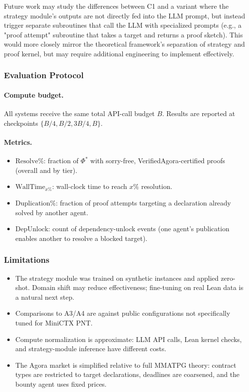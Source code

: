 \begin{remark}
Future work may study the differences between C1 and a variant where the strategy module's outputs are not directly fed into the LLM prompt, but instead trigger separate subroutines that call the LLM with specialized prompts (e.g., a "proof attempt" subroutine that takes a target and returns a proof sketch). This would more closely mirror the theoretical framework's separation of strategy and proof kernel, but may require additional engineering to implement effectively.
\end{remark}


\subsubsection{Evaluation Protocol}\label{sec:protocol}

\paragraph{Compute budget.}
All systems receive the same total API-call budget $B$. Results are reported at checkpoints $\{B/4, B/2, 3B/4, B\}$.

\paragraph{Metrics.}
\begin{itemize}
    \item $\mathrm{Resolve\%}$: fraction of $\Phi^*$ with sorry-free, VerifiedAgora-certified proofs (overall and by tier).
    \item $\mathrm{WallTime}_{x\%}$: wall-clock time to reach $x\%$ resolution.
    \item $\mathrm{Duplication\%}$: fraction of proof attempts targeting a declaration already solved by another agent.
    \item $\mathrm{DepUnlock}$: count of dependency-unlock events (one agent's publication enables another to resolve a blocked target).
\end{itemize}


\subsubsection{Limitations}\label{sec:limitations}

\begin{itemize}
    \item The strategy module was trained on synthetic instances and applied zero-shot. Domain shift may reduce effectiveness; fine-tuning on real Lean data is a natural next step.
    \item Comparisons to A3/A4 are against public configurations not specifically tuned for MiniCTX PNT.
    \item Compute normalization is approximate: LLM API calls, Lean kernel checks, and strategy-module inference have different costs.
    \item The Agora market is simplified relative to full MMATPG theory: contract types are restricted to target declarations, deadlines are coarsened, and the bounty agent uses fixed prices.
\end{itemize}


